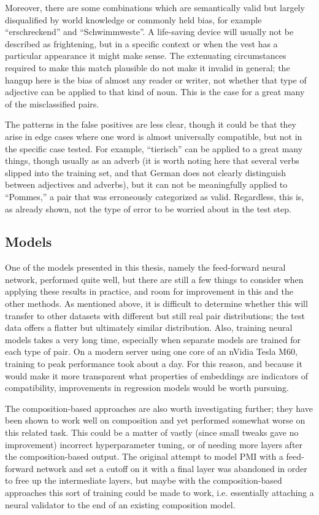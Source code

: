 \documentclass[a4paper, 12pt]{article}
\begin{document}
Moreover, there are some combinations which are semantically valid but largely disqualified by world knowledge or commonly held bias, for example ``erschreckend'' and ``Schwimmweste''. A life-saving device will usually not be described as frightening, but in a specific context or when the vest has a particular appearance it might make sense. The extenuating circumstances required to make this match plausible do not make it invalid in general; the hangup here is the bias of almost any reader or writer, not whether that type of adjective can be applied to that kind of noun. This is the case for a great many of the misclassified pairs.

The patterns in the false positives are less clear, though it could be that they arise in edge cases where one word is almost universally compatible, but not in the specific case tested. For example, ``tierisch'' can be applied to a great many things, though usually as an adverb (it is worth noting here that several verbs slipped into the training set, and that German does not clearly distinguish between adjectives and adverbs), but it can not be meaningfully applied to ``Pommes,'' a pair that was erroneously categorized as valid. Regardless, this is, as already shown, not the type of error to be worried about in the test step.

\subsection{Models}
One of the models presented in this thesis, namely the feed-forward neural network, performed quite well, but there are still a few things to consider when applying these results in practice, and room for improvement in this and the other methods. As mentioned above, it is difficult to determine whether this will transfer to other datasets with different but still real pair distributions; the test data offers a flatter but ultimately similar distribution. Also, training neural models takes a very long time, especially when separate models are trained for each type of pair. On a modern server using one core of an nVidia Tesla M60, training to peak performance took about a day. For this reason, and because it would make it more transparent what properties of embeddings are indicators of compatibility, improvements in regression models would be worth pursuing.

The composition-based approaches are also worth investigating further; they have been shown to work well on composition and yet performed somewhat worse on this related task. This could be a matter of vastly (since small tweaks gave no improvement) incorrect hyperparameter tuning, or of needing more layers after the composition-based output. The original attempt to model PMI with a feed-forward network and set a cutoff on it with a final layer was abandoned in order to free up the intermediate layers, but maybe with the composition-based approaches this sort of training could be made to work, i.e. essentially attaching a neural validator to the end of an existing composition model.
\end{document}
